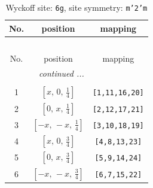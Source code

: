 \documentclass[fleqn,8pt]{jsarticle}
\begin{document}
\renewcommand{\arraystretch}{1.2}
\begin{longtable}{ccc}
\caption{Wyckoff site: {\tt 6g}, site symmetry: {\tt m'2'm}}
 \\
 \hline \hline
No. & position & mapping \\ \hline \endfirsthead

\multicolumn{2}{l}{\tablename\ \thetable{}} \\
 \hline \hline
No. & position & mapping \\ \hline \endhead

 \hline \hline
\multicolumn{2}{r}{\footnotesize\it continued ...} \\ \endfoot

 \hline \hline
\multicolumn{2}{r}{} \\ \endlastfoot

1 & $\left[ x,\, 0,\, \frac{1}{4} \right]$ & {\tt [1,11,16,20]} \\ \hline
2 & $\left[ 0,\, x,\, \frac{1}{4} \right]$ & {\tt [2,12,17,21]} \\ \hline
3 & $\left[ - x,\, - x,\, \frac{1}{4} \right]$ & {\tt [3,10,18,19]} \\ \hline
4 & $\left[ x,\, 0,\, \frac{3}{4} \right]$ & {\tt [4,8,13,23]} \\ \hline
5 & $\left[ 0,\, x,\, \frac{3}{4} \right]$ & {\tt [5,9,14,24]} \\ \hline
6 & $\left[ - x,\, - x,\, \frac{3}{4} \right]$ & {\tt [6,7,15,22]} \\
\end{longtable}
\renewcommand{\arraystretch}{1.2}
\end{document}
